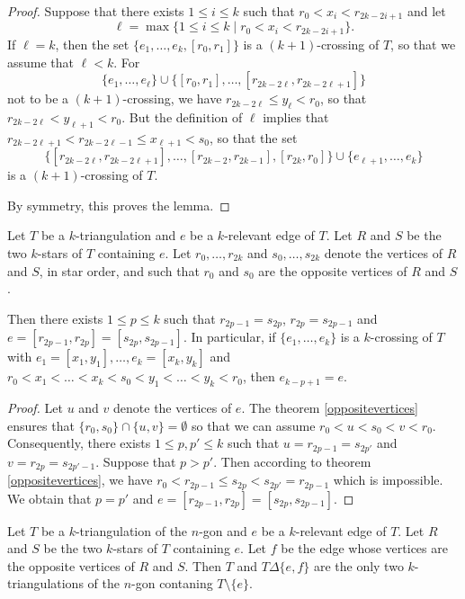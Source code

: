 \documentclass[12pt]{amsart}
\begin{document}
\begin{proof}
Suppose that there exists $1\le i\le k$ such that $r_0<x_i<r_{2k-2i+1}$ and let
$$\ell=\max\{1\le i\le k \;|\; r_0<x_i<r_{2k-2i+1}\}.$$
If $\ell=k$, then the set $\{e_1,\ldots,e_k,[r_0,r_1]\}$ is a $(k+1)$-crossing of $T$, so that we assume that $\ell<k$. For $$\{e_1,\ldots,e_\ell\}\cup\{[r_0,r_1],\ldots,[r_{2k-2\ell},r_{2k-2\ell+1}]\}$$ not to be a $(k+1)$-crossing, we have $r_{2k-2\ell}\le y_\ell<r_0$, so that $r_{2k-2\ell}<y_{\ell+1}<r_0$. But the definition of $\ell$ implies that $r_{2k-2\ell+1}<r_{2k-2\ell-1}\le x_{\ell+1}<s_0$, so that %
the set $$\{[r_{2k-2\ell},r_{2k-2\ell+1}],\ldots,[r_{2k-2},r_{2k-1}],[r_{2k},r_0]\}\cup\{e_{\ell+1},\ldots,e_k\}$$ is a $(k+1)$-crossing of $T$.

By symmetry, this proves the lemma.
\end{proof}

\begin{lemma}
Let $T$ be a $k$-triangulation and $e$ be a $k$-relevant edge of $T$. Let $R$ and $S$ be the two $k$-stars of $T$ containing $e$. Let $r_0,\ldots,r_{2k}$ and $s_0,\ldots,s_{2k}$ denote the vertices of $R$ and $S$, in star order, and such that $r_0$ and $s_0$ are the opposite vertices of $R$ and $S$.

Then there exists $1\le p\le k$ such that $r_{2p-1}=s_{2p}$, $r_{2p}=s_{2p-1}$ and $e=[r_{2p-1},r_{2p}]=[s_{2p},s_{2p-1}]$. In particular, if $\{e_1,\ldots,e_k\}$ is a $k$-crossing of $T$ with $e_1=[x_1,y_1],\ldots,e_k=[x_k,y_k]$ and $r_0<x_1<\ldots<x_k<s_0<y_1<\ldots<y_k<r_0$, then $e_{k-p+1}=e$.
\end{lemma}

\begin{proof}
Let $u$ and $v$ denote the vertices of $e$.
The theorem \ref{oppositevertices} ensures that $\{r_0,s_0\}\cap\{u,v\}=\emptyset$ so that we can assume $r_0<u<s_0<v<r_0$. Consequently, there exists $1\le p,p'\le k$ such that $u=r_{2p-1}=s_{2p'}$ and $v=r_{2p}=s_{2p'-1}$. Suppose that $p>p'$. Then according to theorem \ref{oppositevertices}, we have $r_0<r_{2p-1}\le s_{2p}<s_{2p'}=r_{2p-1}$ which is impossible. We obtain that $p=p'$ and $e=[r_{2p-1},r_{2p}]=[s_{2p},s_{2p-1}]$.
\end{proof}

\begin{proposition}\label{flip}
Let $T$ be a $k$-triangulation of the $n$-gon and $e$ be a $k$-relevant edge of $T$. Let $R$ and $S$ be the two $k$-stars of $T$ containing $e$. Let $f$ be the edge whose vertices are the opposite vertices of $R$ and $S$. Then $T$ and $T\Delta\{e,f\}$ are the only two $k$-triangulations of the $n$-gon contaning $T\setminus\{e\}$.
\end{proposition}
\end{document}
